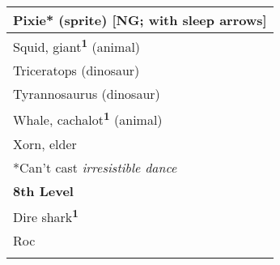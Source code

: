 \begin{longtable}{ll}
\hline
\multicolumn{2}{|p{3.857in}|}{\begin{minipage}[t]{3.857in}\raggedright
Pixie* (sprite) [NG; with sleep arrows]\end{minipage}}\\
\hline
\multicolumn{2}{|p{3.857in}|}{\begin{minipage}[t]{3.857in}\raggedright
Squid, giant\textsuperscript{\textbf{1}}\textbf{} (animal)\end{minipage}}\\
\hline
\multicolumn{2}{|p{3.857in}|}{\begin{minipage}[t]{3.857in}\raggedright
Triceratops (dinosaur)\end{minipage}}\\
\hline
\multicolumn{2}{|p{3.857in}|}{\begin{minipage}[t]{3.857in}\raggedright
Tyrannosaurus (dinosaur)\end{minipage}}\\
\hline
\multicolumn{2}{|p{3.857in}|}{\begin{minipage}[t]{3.857in}\raggedright
Whale, cachalot\textsuperscript{\textbf{1}}\textbf{} (animal)\end{minipage}}\\
\hline
\multicolumn{2}{|p{3.857in}|}{\begin{minipage}[t]{3.857in}\raggedright
Xorn, elder\end{minipage}}\\
\hline
\multicolumn{2}{|p{3.857in}|}{\begin{minipage}[t]{3.857in}\raggedright
*Can't cast \textit{irresistible dance}\end{minipage}}\\
\hline
\multicolumn{2}{|p{3.857in}|}{\begin{minipage}[t]{3.857in}\raggedright
\textbf{8th Level}\end{minipage}}\\
\hline
\multicolumn{2}{|p{3.857in}|}{\begin{minipage}[t]{3.857in}\raggedright
Dire shark\textsuperscript{\textbf{1}}\end{minipage}}\\
\hline
\multicolumn{2}{|p{3.857in}|}{\begin{minipage}[t]{3.857in}\raggedright
Roc\end{minipage}}\\
\hline
\multicolumn{2}{|p{3.857in}|}{\begin{minipage}[t]{3.857in}\raggedright

\end{minipage}}
\end{longtable}
